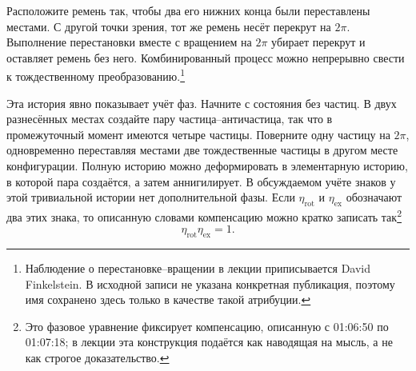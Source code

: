 Расположите ремень так, чтобы два его нижних конца были переставлены местами. С другой точки зрения, тот же ремень несёт перекрут на \(2\pi\). Выполнение перестановки вместе с вращением на \(2\pi\) убирает перекрут и оставляет ремень без него. Комбинированный процесс можно непрерывно свести к тождественному преобразованию.\footnote{Наблюдение о перестановке--вращении в лекции приписывается David Finkelstein. В исходной записи не указана конкретная публикация, поэтому имя сохранено здесь только в качестве такой атрибуции.}

\begin{classroomqa}
\end{classroomqa}

Эта история явно показывает учёт фаз. Начните с состояния без частиц. В двух разнесённых местах создайте пару частица--античастица, так что в промежуточный момент имеются четыре частицы. Поверните одну частицу на \(2\pi\), одновременно переставляя местами две тождественные частицы в другом месте конфигурации. Полную историю можно деформировать в элементарную историю, в которой пара создаётся, а затем аннигилирует. В обсуждаемом учёте знаков у этой тривиальной истории нет дополнительной фазы. Если \(\eta_{\mathrm{rot}}\) и \(\eta_{\mathrm{ex}}\) обозначают два этих знака, то описанную словами компенсацию можно кратко записать так\footnote{Это фазовое уравнение фиксирует компенсацию, описанную с 01:06:50 по 01:07:18; в лекции эта конструкция подаётся как наводящая на мысль, а не как строгое доказательство.}
\begin{equation}
\eta_{\mathrm{rot}}\eta_{\mathrm{ex}}=1.
\end{equation}

\begin{classroomqa}
\end{classroomqa}

